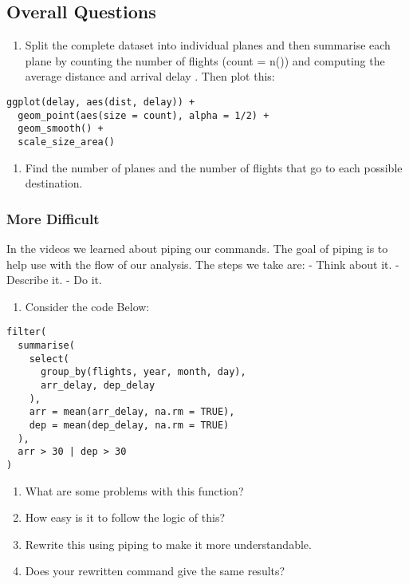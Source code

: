 \documentclass[]{article}
\providecommand{\tightlist}{%
  \setlength{\itemsep}{0pt}\setlength{\parskip}{0pt}}
\begin{document}
\subsection{Overall Questions}\label{overall-questions}

\begin{enumerate}
\def\labelenumi{\arabic{enumi}.}
\setcounter{enumi}{10}
\tightlist
\item
  Split the complete dataset into individual planes and then summarise
  each plane by counting the number of flights (count = n()) and
  computing the average distance and arrival delay . Then plot this:
\end{enumerate}

\begin{verbatim}
ggplot(delay, aes(dist, delay)) +
  geom_point(aes(size = count), alpha = 1/2) +
  geom_smooth() +
  scale_size_area()
\end{verbatim}

\begin{enumerate}
\def\labelenumi{\arabic{enumi}.}
\setcounter{enumi}{11}
\tightlist
\item
  Find the number of planes and the number of flights that go to each
  possible destination.
\end{enumerate}

\subsubsection{More Difficult}\label{more-difficult}

In the videos we learned about piping our commands. The goal of piping
is to help use with the flow of our analysis. The steps we take are: -
Think about it. - Describe it. - Do it.

\begin{enumerate}
\def\labelenumi{\arabic{enumi}.}
\setcounter{enumi}{12}
\tightlist
\item
  Consider the code Below:
\end{enumerate}

\begin{verbatim}
filter(
  summarise(
    select(
      group_by(flights, year, month, day),
      arr_delay, dep_delay
    ),
    arr = mean(arr_delay, na.rm = TRUE),
    dep = mean(dep_delay, na.rm = TRUE)
  ),
  arr > 30 | dep > 30
)
\end{verbatim}

\begin{enumerate}
\def\labelenumi{\alph{enumi}.}
\tightlist
\item
  What are some problems with this function?
\item
  How easy is it to follow the logic of this?
\item
  Rewrite this using piping to make it more understandable.
\item
  Does your rewritten command give the same results?
\end{enumerate}
\end{document}
